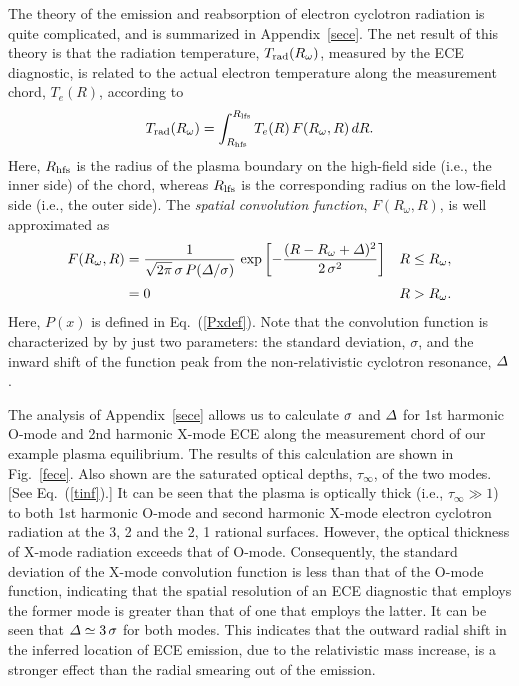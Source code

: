 \documentclass[12pt,prb,aps]{revtex4-1}
\begin{document}
The theory of the emission and reabsorption of electron cyclotron radiation is quite complicated, and is summarized in Appendix~\ref{sece}. 
The net result of this theory is that the radiation temperature, $T_{\rm rad}(R_\omega)$, measured by the ECE diagnostic, is related
to the actual electron temperature along the measurement chord, $T_e(R)$, according to
\begin{equation}
T_{\rm rad}(R_\omega)  = \int^{R_{\rm lfs}}_{R_{\rm hfs}} T_e(R)\,F(R_\omega, R)\,dR.
\end{equation}
Here, $R_{\rm hfs}$ is the radius
of the plasma boundary on the high-field side (i.e., the inner side) of the chord, whereas $R_{\rm lfs}$ is the corresponding radius 
on the low-field side (i.e., the outer side). The {\em spatial convolution function}, $F(R_\omega,R)$, is well approximated as
\begin{align}
F(R_\omega,R)&= \frac{1}{\sqrt{2\pi}\,\sigma \,P({\mit\Delta}/\sigma)}\,
\exp\left[-\frac {(R-R_\omega+{\mit\Delta})^2}{2\,\sigma^2}\right]&R\leq R_\omega,\\[0.5ex]
&= 0& R>R_\omega.
\end{align}
Here, $P(x)$ is defined in Eq.~(\ref{Pxdef}). Note that the convolution function is characterized by by just two parameters: the standard deviation, $\sigma$, and the inward shift
of the function peak from the non-relativistic cyclotron resonance, ${\mit\Delta}$. 

The analysis of Appendix~\ref{sece} allows us to calculate ${\mit\sigma}$ and ${\mit\Delta}$ for 1st harmonic O-mode and 2nd harmonic X-mode ECE along the
measurement chord of our example plasma equilibrium. The results of this calculation are shown in Fig.~\ref{fece}. Also shown are the saturated optical
depths, $\tau_\infty$, of the two modes. [See Eq.~(\ref{tinf}).] It can be seen that the plasma is optically thick (i.e., $\tau_\infty\gg 1$) to both
1st harmonic O-mode and second harmonic X-mode electron cyclotron radiation at the 3, 2 and the 2, 1 rational surfaces. However, the optical thickness of X-mode
radiation exceeds that of O-mode. Consequently, the standard deviation of the X-mode convolution function is less than that of the O-mode
function, indicating that the spatial resolution of an ECE diagnostic that employs the former mode is greater than that of one that employs the latter. 
It can be seen that ${\mit\Delta}\simeq 3\,\sigma$ for both modes. This indicates that the outward radial shift in the inferred location of
ECE emission, due to the relativistic mass increase, is a stronger effect than the radial smearing out of the emission. 
\end{document}
